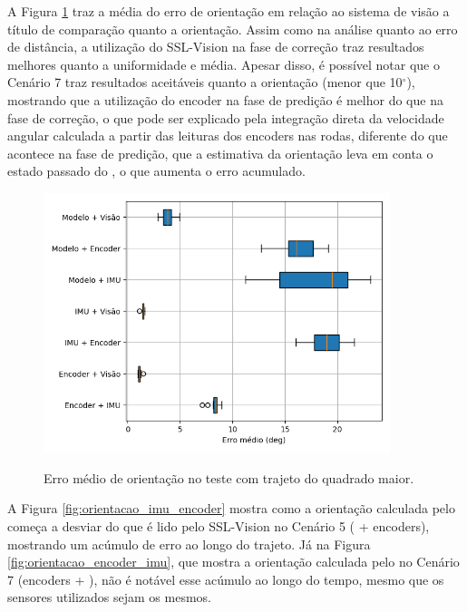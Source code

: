 \documentclass[acronym, symbols, table]{fei}
\begin{document}
		A Figura \ref{fig:erro_medio_orientacao_quad_maior} traz a média do erro de orientação em relação ao sistema de visão a título de comparação quanto a orientação. Assim como na análise quanto ao erro de distância, a utilização do SSL-Vision na fase de correção traz resultados melhores quanto a uniformidade e média. Apesar disso, é possível notar que o Cenário 7 traz resultados aceitáveis quanto a orientação (menor que 10$^\circ$), mostrando que a utilização do encoder na fase de predição é melhor do que na fase de correção, o que pode ser explicado pela integração direta da velocidade angular calculada a partir das leituras dos encoders nas rodas, diferente do que acontece na fase de predição, que a estimativa da orientação leva em conta o estado passado do , o que aumenta o erro acumulado.
	
		\begin{figure}[!htb]
			\centering
			\caption{Erro médio de orientação no teste com trajeto do quadrado maior.}
			\includegraphics[width=0.9\textwidth]{../Dados/Graficos-Resultados/erro_medio_orientacao_quadrado_maior.png}
			\label{fig:erro_medio_orientacao_quad_maior}
		\end{figure}
	
		A Figura \ref{fig:orientacao_imu_encoder} mostra como a orientação calculada pelo  começa a desviar do que é lido pelo SSL-Vision no Cenário 5 ( + encoders), mostrando um acúmulo de erro ao longo do trajeto. Já na Figura \ref{fig:orientacao_encoder_imu}, que mostra a orientação calculada pelo  no Cenário 7 (encoders + ), não é notável esse acúmulo ao longo do tempo, mesmo que os sensores utilizados sejam os mesmos.
	
\end{document}
